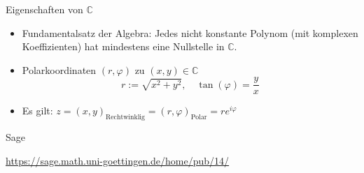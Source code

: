 \documentclass[notes=hide,hyperref={dvipdfmx,pdfpagelabels=false}]{beamer}
\begin{document}
\begin{frame}[fragile]{Eigenschaften von $\mathbb{C}$}
\begin{itemize}
\item \alert{Fundamentalsatz der Algebra}: Jedes nicht konstante Polynom (mit komplexen Koeffizienten) hat mindestens eine Nullstelle in $\mathbb{C}$. 
\item Polarkoordinaten $(r, \varphi)$ zu $(x,y) \in \mathbb{C}$
\[  r:= \sqrt{x^2+y^2}, \quad \tan(\varphi)=\frac{y}{x} \] 

\item Es gilt: $z = (x,y)_{\text{Rechtwinklig}} = (r,\varphi)_{\text{Polar}} = re^{i\varphi}$
\end{itemize}
\end{frame}


\begin{frame}[fragile]{Sage}
\begin{center}
\url{https://sage.math.uni-goettingen.de/home/pub/14/}
\end{center}
\end{frame}



\end{document}
